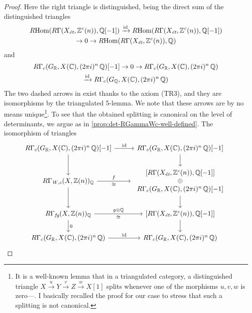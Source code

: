 \begin{proposition}
\begin{proof}
    Here the right triangle is distinguished, being the direct sum of the
    distinguished triangles
    \begin{multline*}
      R\!\operatorname{Hom} (R\Gamma (X_\text{\it ét}, \mathbb{Z}^c (n)), \mathbb{Q} [-1])
      \xrightarrow{\mathrm{id}}
      R\!\operatorname{Hom} (R\Gamma (X_\text{\it ét}, \mathbb{Z}^c (n)), \mathbb{Q} [-1]) \\
      \to 0 \to R\!\operatorname{Hom} (R\Gamma (X_\text{\it ét}, \mathbb{Z}^c (n)), \mathbb{Q})
    \end{multline*}
    and
    \begin{multline*}
      R\Gamma_c (G_{\mathbb{R}}, X (\mathbb{C}), (2\pi i)^n\,\mathbb{Q}) [-1] \to
      0 \to R\Gamma_c (G_{\mathbb{R}}, X (\mathbb{C}), (2\pi i)^n\,\mathbb{Q}) \\
      \xrightarrow{\mathrm{id}} R\Gamma_c (G_{\mathbb{Q}}, X (\mathbb{C}), (2\pi i)^n\,\mathbb{Q})
    \end{multline*}
    The two dashed arrows in  exist thanks
    to the axiom (TR3), and they are isomorphisms by the triangulated
    5-lemma. We note that these arrows are by no means unique\footnote{It is a
      well-known lemma that in a triangulated category, a distinguished triangle
      $X \xrightarrow{u} Y \xrightarrow{v} Z \xrightarrow{w} X [1]$ splits
      whenever one of the morphisms $u,v,w$ is zero---\cite[Chapitre II,
      Corollaire 1.2.6]{Verdier-thesis}. I basically recalled the proof for our
      case to stress that such a splitting is not canonical.}. To see that the
    obtained splitting is canonical on the level of determinants, we argue as in
    \ref{prop:det-RGammaWc-well-defined}. The isomorphism of triangles
    \[ \begin{tikzcd}
        R\Gamma_c (G_\RR, X (\CC), (2\pi i)^n\,\QQ) [-1] \ar{d} \ar{r}{\idid} & R\Gamma_c (G_\RR, X (\CC), (2\pi i)^n\,\QQ) [-1] \ar{d} \\
        R\Gamma_\text{\it W,c} (X, \ZZ (n))_\QQ \ar{d}\ar{r}{f}[swap]{\isom} & {\begin{array}{c}[R\Gamma (X_\text{\it ét}, \ZZ^c (n)), \QQ [-1]]\\\oplus \\R\Gamma_c (G_\RR, X (\CC), (2\pi i)^n\,\QQ) [-1]\end{array}} \ar{d} \\
        R\Gamma_\text{\it fg} (X, \ZZ (n))_\QQ \ar{d}{0}\ar{r}{g\otimes\QQ}[swap]{\isom} & {[R\Gamma (X_\text{\it ét}, \ZZ^c (n)), \QQ [-1]]} \ar{d} \\
        R\Gamma_c (G_\RR, X (\CC), (2\pi i)^n\,\QQ) \ar{r}{\idid} & R\Gamma_c (G_\RR, X (\CC), (2\pi i)^n\,\QQ)
      \end{tikzcd} \]

\end{proof}
\end{proposition}
